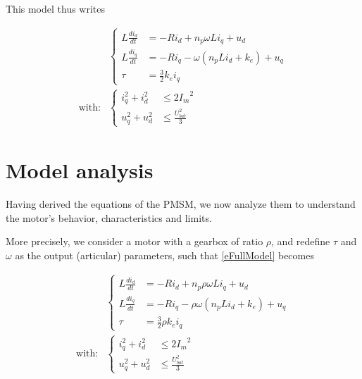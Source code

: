 \documentclass[a4paper,10pt]{article}
\begin{document}
This model thus writes

\begin{equation}
	\boxed{\begin{aligned}
		&\left\{
		\begin{aligned}
			L \frac{d i_d}{dt} &= - R i_d + n_p\omega L i_q + u_d \\
			L \frac{d i_q}{dt} &= - R i_q - \omega (n_p L i_d + k_e) + u_q\\
			\tau &= \frac{3}{2} k_e i_q
		\end{aligned}
		\right.\\
		\text{with:}
		&\left\{
		\begin{aligned}
			i_q^2 + i_d^2 &\leq 2 {I_m}^2 \\
			u_q^2 + u_d^2 &\leq \frac{U_{bat}^2}{3}
		\end{aligned}
		\right.
	\end{aligned}}
	\label{eFullModel}
\end{equation}


\section{Model analysis}

Having derived the equations of the PMSM, we now analyze them to understand the motor's behavior, characteristics and limits.

More precisely, we consider a motor with a gearbox of ratio $\rho$, and redefine $\tau$ and $\omega$ as the output (articular) parameters, such that \eqref{eFullModel} becomes

\begin{equation}
	\begin{aligned}
			&\left\{
			\begin{aligned}
				L \frac{d i_d}{dt} &= - R i_d + n_p \rho \omega  L i_q + u_d \\
				L \frac{d i_q}{dt} &= - R i_q - \rho \omega (n_p L i_d + k_e) + u_q\\
				\tau &= \frac{3}{2} \rho k_e i_q
			\end{aligned}
			\right.\\
			\text{with:}
			&\left\{
			\begin{aligned}
				i_q^2 + i_d^2 &\leq 2 {I_m}^2 \\
				u_q^2 + u_d^2 &\leq \frac{U_{bat}^2}{3}
			\end{aligned}
			\right.
	\end{aligned}
	\label{eFullModelArticular}
\end{equation}
\end{document}
